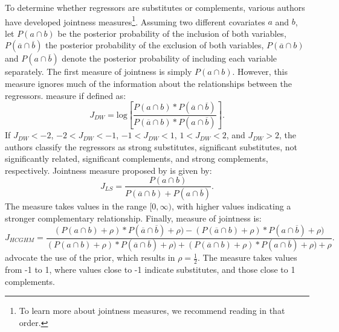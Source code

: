\documentclass[a4paper]{article}
\begin{document}
\indent To determine whether regressors are substitutes or complements, various authors have developed jointness measures\footnote{To learn more about jointness measures, we recommend reading \citet{Doppelhofer+2009, Ley+2007, Hofmarcher+2018} in that order.}. Assuming two different covariates $a$ and $b$, let $P(a\cap b)$ be the posterior probability of the inclusion of both variables, $P(\overline{a}\cap \overline{b})$ the posterior probability of the exclusion of both variables, $P(\overline{a}\cap b)$ and $P(a\cap \overline{b})$ denote the posterior probability of including each variable separately. The first measure of jointness is simply $P(a\cap b)$. However, this measure ignores much of the information about the relationships between the regressors. \citet{Doppelhofer+2009} measure if defined as:
\begin{equation}
    J_{DW}=\text{log}\left[\frac{P(a\cap b)*P(\overline{a}\cap \overline{b})}{P(\overline{a}\cap b)*P(a\cap \overline{b})}\right].
\end{equation}
If $J_{DW} < -2$, $-2 < J_{DW} < -1$, $-1 < J_{DW} < 1$, $1 < J_{DW} < 2$, and $J_{DW} > 2$, the authors classify the regressors as strong substitutes, significant substitutes, not significantly related, significant complements, and strong complements, respectively. Jointness measure proposed by \citet{Ley+2007} is given by:
\begin{equation}
    J_{LS}=\frac{P(a\cap b)}{P(\overline{a}\cap b)+P(a\cap \overline{b})}.
\end{equation}
The measure takes values in the range $[0, \infty)$, with higher values indicating a stronger complementary relationship. Finally, \citet{Hofmarcher+2018} measure of jointness is:
\begin{equation}
    J_{HCGHM}=\frac{(P(a\cap b)+\rho)*P(\overline{a}\cap \overline{b})+\rho)-(P(\overline{a}\cap b)+\rho)*P(a\cap \overline{b})+\rho)}{(P(a\cap b)+\rho)*P(\overline{a}\cap \overline{b})+\rho)+(P(\overline{a}\cap b)+\rho)*P(a\cap \overline{b})+\rho)+\rho}.
\end{equation}
\citet{Hofmarcher+2018} advocate the use of the \citet{Jeffreys+1946} prior, which results in $\rho=\frac{1}{2}$. The measure takes values from -1 to 1, where values close to -1 indicate substitutes, and those close to 1 complements.
\end{document}
